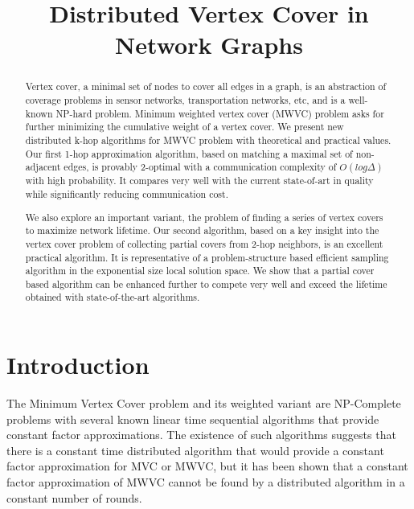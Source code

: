 

\title{Distributed Vertex Cover in Network Graphs} 

\author{
}

\maketitle

\begin{abstract}
 Vertex cover, a minimal set of nodes to cover all edges in a graph, is an abstraction of coverage problems in sensor networks, transportation networks, etc, and is a well-known NP-hard problem.  Minimum weighted vertex cover (MWVC) problem asks for further minimizing the cumulative weight of a vertex cover.  We present new distributed k-hop algorithms for MWVC problem with theoretical and practical values.  Our first 1-hop approximation algorithm, based on matching a maximal set of non-adjacent edges, is provably 2-optimal with a communication complexity of $O(log \Delta)$ with high probability. It compares very well with the current state-of-art in quality while significantly reducing communication cost.

We also explore an important variant, the problem of finding a series of vertex covers to maximize network lifetime.  Our second algorithm, based on a key insight into the vertex cover problem of collecting partial covers from 2-hop neighbors, is an excellent practical algorithm.  It is representative of a problem-structure based efficient sampling algorithm in the exponential size local solution space.   We show that a partial cover based algorithm can be enhanced further to compete very well and exceed the lifetime obtained with state-of-the-art algorithms. 
\end{abstract}
\section{Introduction}
The Minimum Vertex Cover problem and its weighted variant are NP-Complete problems with several known linear time sequential algorithms that provide constant factor approximations. The existence of such algorithms suggests that there is a constant time distributed algorithm that would provide a constant factor approximation for MVC or MWVC, but it has been shown that a constant factor approximation of MWVC cannot be found by a distributed algorithm in a constant number of rounds\cite{1011811}. 

